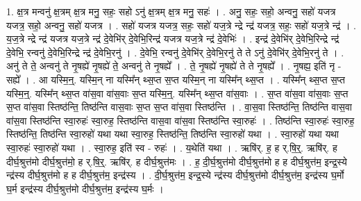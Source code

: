 \documentclass[17pt]{extarticle}
\begin{document}
1. क्ष॒त्र मन्वनु॑ क्ष॒त्रम् क्ष॒त्र मनु॒ सहः॒ सहो ऽनु॑ क्ष॒त्रम् क्ष॒त्र मनु॒ सहः॑ । . अनु॒ सहः॒ सहो॒ अन्वनु॒ सहो॑ यजत्र यजत्र॒ सहो॒ अन्वनु॒ सहो॑ यजत्र । . सहो॑ यजत्र यजत्र॒ सहः॒ सहो॑ यज॒त्रे न्द्रे न्द्र॑ यजत्र॒ सहः॒ सहो॑ यज॒त्रे न्द्र॑ । . य॒ज॒त्रे न्द्रे न्द्र॑ यजत्र यज॒त्रे न्द्र॑ दे॒वेभि॑र् दे॒वेभि॒रिन्द्र॑ यजत्र यज॒त्रे न्द्र॑ दे॒वेभिः॑ । . इन्द्र॑ दे॒वेभि॑र् दे॒वेभि॒रिन्द्रे न्द्र॑ दे॒वेभि॒ रन्वनु॑ दे॒वेभि॒रिन्द्रे न्द्र॑ दे॒वेभि॒रनु॑ । . दे॒वेभि॒ रन्वनु॑ दे॒वेभि॑र् दे॒वेभि॒रनु॑ ते ते ऽनु॑ दे॒वेभि॑र् दे॒वेभि॒रनु॑ ते । . अनु॑ ते ते॒ अन्वनु॑ ते नृ॒षह्ये॑ नृ॒षह्ये॑ ते॒ अन्वनु॑ ते नृ॒षह्ये᳚ । . ते॒ नृ॒षह्ये॑ नृ॒षह्ये॑ ते ते नृ॒षह्ये᳚ । . नृ॒षह्य॒ इति॑ नृ - सह्ये᳚ । . आ यस्मि॒न्॒. यस्मि॒न् ना यस्मि᳚न् थ्स॒प्त स॒प्त यस्मि॒न् ना यस्मि᳚न् थ्स॒प्त । . यस्मि᳚न् थ्स॒प्त स॒प्त यस्मि॒न्॒. यस्मि᳚न् थ्स॒प्त वा॑स॒वा वा॑स॒वाः स॒प्त यस्मि॒न्॒. यस्मि᳚न् थ्स॒प्त वा॑स॒वाः । . स॒प्त वा॑स॒वा वा॑स॒वाः स॒प्त स॒प्त वा॑स॒वा स्तिष्ठ॑न्ति॒ तिष्ठ॑न्ति वास॒वाः स॒प्त स॒प्त वा॑स॒वा स्तिष्ठ॑न्ति । . वा॒स॒वा स्तिष्ठ॑न्ति॒ तिष्ठ॑न्ति वास॒वा वा॑स॒वा स्तिष्ठ॑न्ति स्वा॒रुहः॑ स्वा॒रुह॒ स्तिष्ठ॑न्ति वास॒वा वा॑स॒वा स्तिष्ठ॑न्ति स्वा॒रुहः॑ । . तिष्ठ॑न्ति स्वा॒रुहः॑ स्वा॒रुह॒ स्तिष्ठ॑न्ति॒ तिष्ठ॑न्ति स्वा॒रुहो॑ यथा यथा स्वा॒रुह॒ स्तिष्ठ॑न्ति॒ तिष्ठ॑न्ति स्वा॒रुहो॑ यथा । . स्वा॒रुहो॑ यथा यथा स्वा॒रुहः॑ स्वा॒रुहो॑ यथा । . स्वा॒रुह॒ इति॑ स्व - रुहः॑ । . य॒थेति॑ यथा । . ऋषि॑र्. ह॒ ह र्.षि॒र्॒. ऋषि॑र्. ह दीर्घ॒श्रुत्त॑मो दीर्घ॒श्रुत्त॑मो॒ ह र्.षि॒र्॒. ऋषि॑र्. ह दीर्घ॒श्रुत्त॑मः । . ह॒ दी॒र्घ॒श्रुत्त॑मो दीर्घ॒श्रुत्त॑मो ह ह दीर्घ॒श्रुत्त॑म॒ इन्द्र॒स्ये न्द्र॑स्य दीर्घ॒श्रुत्त॑मो ह ह दीर्घ॒श्रुत्त॑म॒ इन्द्र॑स्य । . दी॒र्घ॒श्रुत्त॑म॒ इन्द्र॒स्ये न्द्र॑स्य दीर्घ॒श्रुत्त॑मो दीर्घ॒श्रुत्त॑म॒ इन्द्र॑स्य घ॒र्मो घ॒र्म इन्द्र॑स्य दीर्घ॒श्रुत्त॑मो दीर्घ॒श्रुत्त॑म॒ इन्द्र॑स्य घ॒र्मः । \newline
\end{document}
